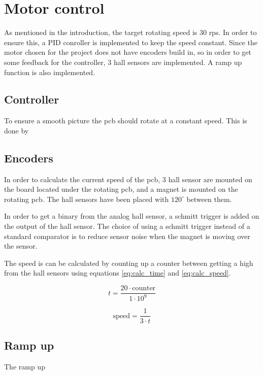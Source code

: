 \section{Motor control}
As mentioned in the introduction, the target rotating speed is 30 rps.
In order to ensure this, a PID conroller is implemented to keep the speed constant.
Since the motor chosen for the project does not have encoders build in, so in order to get some feedback for the controller, 3 hall sensors are implemented.
A ramp up function is also implemented.

\subsection{Controller}

To ensure a smooth picture the pcb should rotate at a constant speed.
This is done by

\subsection{Encoders} \label{sec:encoders}

In order to calculate the current speed of the pcb, 3 hall sensor are mounted on the board located under the rotating pcb, and a magnet is mounted on the rotating pcb.
The hall sensors have been placed with $120^{\circ}$ between them.

In order to get a binary from the analog hall sensor, a schmitt trigger is added on the output of the hall sensor.
The choice of using a schmitt trigger instead of a standard comparator is to reduce sensor noise when the magnet is moving over the sensor.

The speed is can be calculated by counting up a counter between getting a high from the hall sensors using equations  \ref{eq:calc_time} and \ref{eq:calc_speed}.

\begin{equation} \label{eq:calc_time}
 t = \frac{20\cdot \text{counter}}{1\cdot 10^9}
\end{equation}

\begin{equation} \label{eq:calc_speed}
 \text{speed} = \frac{1}{3\cdot t}
\end{equation}

\subsection{Ramp up}
The ramp up